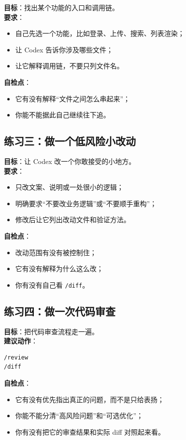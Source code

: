 \documentclass[UTF8,a4paper,12pt]{ctexart}
\begin{document}
\textbf{目标}：找出某个功能的入口和调用链。\\
\textbf{要求}：
\begin{itemize}
  \item 自己先选一个功能，比如登录、上传、搜索、列表渲染；
  \item 让 Codex 告诉你涉及哪些文件；
  \item 让它解释调用链，不要只列文件名。
\end{itemize}

\textbf{自检点}：
\begin{itemize}
  \item 它有没有解释“文件之间怎么串起来”；
  \item 你能不能据此自己继续往下追。
\end{itemize}

\subsection{练习三：做一个低风险小改动}

\textbf{目标}：让 Codex 改一个你敢接受的小地方。\\
\textbf{要求}：
\begin{itemize}
  \item 只改文案、说明或一处很小的逻辑；
  \item 明确要求“不要改业务逻辑”或“不要顺手重构”；
  \item 修改后让它列出改动文件和验证方法。
\end{itemize}

\textbf{自检点}：
\begin{itemize}
  \item 改动范围有没有被控制住；
  \item 它有没有解释为什么这么改；
  \item 你有没有自己看 \texttt{/diff}。
\end{itemize}

\subsection{练习四：做一次代码审查}

\textbf{目标}：把代码审查流程走一遍。\\
\textbf{建议动作}：

\begin{lstlisting}[style=cli]
/review
/diff
\end{lstlisting}

\textbf{自检点}：
\begin{itemize}
  \item 它有没有优先指出真正的问题，而不是只给表扬；
  \item 你能不能分清“高风险问题”和“可选优化”；
  \item 你有没有把它的审查结果和实际 diff 对照起来看。
\end{itemize}
\end{document}
